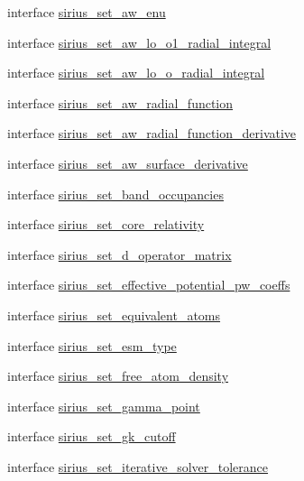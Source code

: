 \begin{DoxyCompactItemize}
interface \hyperlink{interfacesirius_1_1sirius__set__aw__enu}{sirius\+\_\+set\+\_\+aw\+\_\+enu}
\item 
interface \hyperlink{interfacesirius_1_1sirius__set__aw__lo__o1__radial__integral}{sirius\+\_\+set\+\_\+aw\+\_\+lo\+\_\+o1\+\_\+radial\+\_\+integral}
\item 
interface \hyperlink{interfacesirius_1_1sirius__set__aw__lo__o__radial__integral}{sirius\+\_\+set\+\_\+aw\+\_\+lo\+\_\+o\+\_\+radial\+\_\+integral}
\item 
interface \hyperlink{interfacesirius_1_1sirius__set__aw__radial__function}{sirius\+\_\+set\+\_\+aw\+\_\+radial\+\_\+function}
\item 
interface \hyperlink{interfacesirius_1_1sirius__set__aw__radial__function__derivative}{sirius\+\_\+set\+\_\+aw\+\_\+radial\+\_\+function\+\_\+derivative}
\item 
interface \hyperlink{interfacesirius_1_1sirius__set__aw__surface__derivative}{sirius\+\_\+set\+\_\+aw\+\_\+surface\+\_\+derivative}
\item 
interface \hyperlink{interfacesirius_1_1sirius__set__band__occupancies}{sirius\+\_\+set\+\_\+band\+\_\+occupancies}
\item 
interface \hyperlink{interfacesirius_1_1sirius__set__core__relativity}{sirius\+\_\+set\+\_\+core\+\_\+relativity}
\item 
interface \hyperlink{interfacesirius_1_1sirius__set__d__operator__matrix}{sirius\+\_\+set\+\_\+d\+\_\+operator\+\_\+matrix}
\item 
interface \hyperlink{interfacesirius_1_1sirius__set__effective__potential__pw__coeffs}{sirius\+\_\+set\+\_\+effective\+\_\+potential\+\_\+pw\+\_\+coeffs}
\item 
interface \hyperlink{interfacesirius_1_1sirius__set__equivalent__atoms}{sirius\+\_\+set\+\_\+equivalent\+\_\+atoms}
\item 
interface \hyperlink{interfacesirius_1_1sirius__set__esm__type}{sirius\+\_\+set\+\_\+esm\+\_\+type}
\item 
interface \hyperlink{interfacesirius_1_1sirius__set__free__atom__density}{sirius\+\_\+set\+\_\+free\+\_\+atom\+\_\+density}
\item 
interface \hyperlink{interfacesirius_1_1sirius__set__gamma__point}{sirius\+\_\+set\+\_\+gamma\+\_\+point}
\item 
interface \hyperlink{interfacesirius_1_1sirius__set__gk__cutoff}{sirius\+\_\+set\+\_\+gk\+\_\+cutoff}
\item 
interface \hyperlink{interfacesirius_1_1sirius__set__iterative__solver__tolerance}{sirius\+\_\+set\+\_\+iterative\+\_\+solver\+\_\+tolerance}

\end{DoxyCompactItemize}
